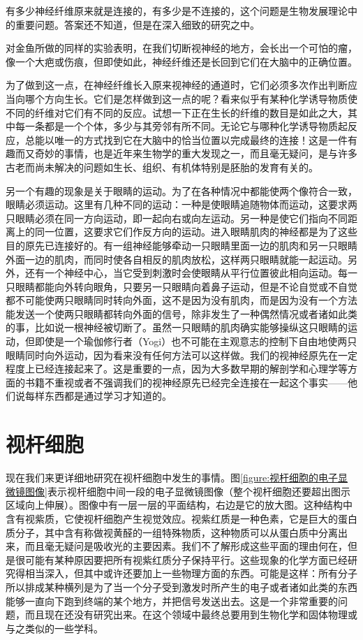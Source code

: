 有多少神经纤维原来就是连接的，有多少是不连接的，这个问题是生物发展理论中的重要问题。答案还不知道，但是在深入细致的研究之中。

对金鱼所做的同样的实验表明，在我们切断视神经的地方，会长出一个可怕的瘤，像一个大疤或伤痕，但即使如此，神经纤维还是长回到它们在大脑中的正确位置。

为了做到这一点，在神经纤维长入原来视神经的通道时，它们必须多次作出判断应当向哪个方向生长。它们是怎样做到这一点的呢？看来似乎有某种化学诱导物质使不同的纤维对它们有不同的反应。试想一下正在生长的纤维的数目是如此之大，其中每一条都是一个个体，多少与其旁邻有所不同。无论它与哪种化学诱导物质起反应，总能以唯一的方式找到它在大脑中的恰当位置以完成最终的连接！这是一件有趣而又奇妙的事情，也是近年来生物学的重大发现之一，而且毫无疑问，是与许多古老而尚未解决的问题如生长、组织、有机体特别是胚胎的发育有关的。

另一个有趣的现象是关于眼睛的运动。为了在各种情况中都能使两个像符合一致，眼睛必须运动。这里有几种不同的运动：一种是使眼睛追随物体而运动，这要求两只眼睛必须在同一方向运动，即一起向右或向左运动。另一种是使它们指向不同距离上的同一位置，这要求它们作反方向的运动。进入眼睛肌肉的神经都是为了这些目的原先已连接好的。有一组神经能够牵动一只眼睛里面一边的肌肉和另一只眼睛外面一边的肌肉，而同时使各自相反的肌肉放松，这样两只眼睛就能一起运动。另外，还有一个神经中心，当它受到刺激时会使眼睛从平行位置彼此相向运动。每一只眼睛都能向外转向眼角，只要另一只眼睛向着鼻子运动，但是不论自觉或不自觉都不可能使两只眼睛同时转向外面，这不是因为没有肌肉，而是因为没有一个方法能发送一个使两只眼睛都转向外面的信号，除非发生了一种偶然情况或者诸如此类的事，比如说一根神经被切断了。虽然一只眼睛的肌肉确实能够操纵这只眼睛的运动，但即使是一个瑜伽修行者（Yogi）也不可能在主观意志的控制下自由地使两只眼睛同时向外运动，因为看来没有任何方法可以这样做。我们的视神经原先在一定程度上已经连接起来了。这是重要的一点，因为大多数早期的解剖学和心理学等方面的书籍不重视或者不强调我们的视神经原先已经完全连接在一起这个事实——他们说每样东西都是通过学习才知道的。

\section{视杆细胞}

现在我们来更详细地研究在视杆细胞中发生的事情。图\ref{figure:视杆细胞的电子显微镜图像}表示视杆细胞中间一段的电子显微镜图像（整个视杆细胞还要超出图示区域向上伸展）。图像中有一层一层的平面结构，右边是它的放大图。这种结构中含有视紫质，它使视杆细胞产生视觉效应。视紫红质是一种色素，它是巨大的蛋白质分子，其中含有称做视黄醛的一组特殊物质，这种物质可以从蛋白质中分离出来，而且毫无疑问是吸收光的主要因素。我们不了解形成这些平面的理由何在，但是很可能有某种原因要把所有视紫红质分子保持平行。这些现象的化学方面已经研究得相当深入，但其中或许还要加上一些物理方面的东西。可能是这样：所有分子所以排成某种横列是为了当一个分子受到激发时所产生的电子或者诸如此类的东西能够一直向下跑到终端的某个地方，并把信号发送出去。这是一个非常重要的问题，而且现在还没有研究出来。在这个领域中最终总要用到生物化学和固体物理或与之类似的一些学科。

